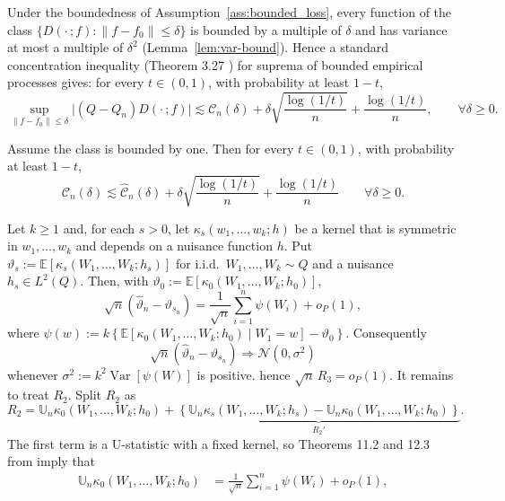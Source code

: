 Under the boundedness of Assumption~\ref{ass:bounded_loss}, every function of the class
$\{D(\cdot\,; f) : \|f - f_0\| \le \delta\}$ is bounded by a multiple of $\delta$
and has variance at most a multiple of $\delta^2$ (Lemma~\ref{lem:var-bound}).
Hence a standard concentration inequality (Theorem 3.27 \citet{wainwright2019high}) for suprema of bounded empirical processes gives: for every $t \in (0,1)$,
with probability at least $1 - t$,
\begin{equation}
\label{eq:local-dev}
\sup_{\|f - f_0\| \le \delta}\Big|(Q - Q_n) D(\cdot\,; f)\Big|
 \lesssim
\mathcal{C}_n(\delta) + \delta\sqrt{\frac{\log(1/t)}{n}} + \frac{\log(1/t)}{n},
\qquad \forall \delta \ge 0.
\end{equation}
\begin{lemma}\label{lem:emp-pop-rad}
Assume the class is bounded by one. Then for every $t \in (0,1)$, with probability at least $1 - t$,
\[
\mathcal{C}_n(\delta)
 \lesssim
\hat{\mathcal{C}}_n(\delta) + \delta\sqrt{\frac{\log(1/t)}{n}} + \frac{\log(1/t)}{n}
\qquad \forall \delta \ge 0.
\]
\end{lemma}
\label{thm:smooth_clt}
Let $k \ge 1$ and, for each $s > 0$, let $\kappa_s(w_1, \dots, w_k; h)$ be a kernel that is symmetric in $w_1, \dots, w_k$ and depends on a nuisance function $h$. Put $\vartheta_s := \mathbb{E}\left[\kappa_s(W_1, \dots, W_k; h_s)\right]$ for i.i.d.\ $W_1, \dots, W_k \sim Q$ and a nuisance $h_s \in L^2(Q)$.
Then, with $\vartheta_0 := \mathbb{E}\left[\kappa_0(W_1, \dots, W_k; h_0)\right]$,
\[
\sqrt{n}(\hat{\vartheta}_n - \vartheta_{s_n}) = \frac{1}{\sqrt{n}}\sum_{i = 1}^n \psi(W_i) + o_P(1),
\]
where $\psi(w) := k\left\{\mathbb{E}[\kappa_0(W_1, \dots, W_k; h_0) \mid W_1 = w] - \vartheta_0\right\}$. Consequently
\[
\sqrt{n}(\hat{\vartheta}_n - \vartheta_{s_n}) \Rightarrow \mathcal{N}(0, \sigma^2)
\]
whenever $\sigma^2 := k^2 \operatorname{Var}[\psi(W)]$ is positive.
hence $\sqrt{n}\, R_3 = o_P(1)$. It remains to treat $R_2$.
Split $R_2$ as
\[
R_2 = \mathbb{U}_{n} \kappa_0(W_{1}, \dots, W_{k}; h_0) + \underbrace{\left\{\mathbb{U}_{n} \kappa_s(W_{1}, \dots, W_{k}; h_s) - \mathbb{U}_{n} \kappa_0(W_{1}, \dots, W_{k}; h_0)\right\}}_{R_2'}.
\]
The first term is a U-statistic with a fixed kernel, so Theorems 11.2 and 12.3 from \citet{van2000asymptotic} imply that
\begin{align*}
\mathbb{U}_{n} \kappa_0(W_1, \dots, W_k; h_0) &= \frac{1}{\sqrt{n}}\sum_{i = 1}^n \psi(W_i) + o_P(1),
\end{align*}
